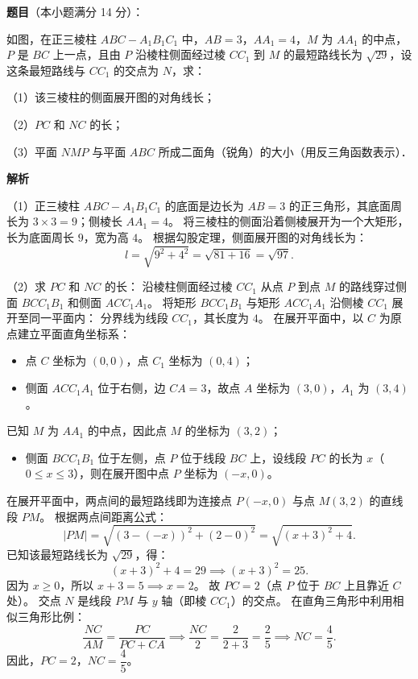 \begin{answer}

\textbf{题目}（本小题满分 14 分）：

如图，在正三棱柱 $ABC-A_1B_1C_1$ 中，$AB=3$，$AA_1=4$，$M$ 为 $AA_1$ 的中点，$P$ 是 $BC$ 上一点，且由 $P$ 沿棱柱侧面经过棱 $CC_1$ 到 $M$ 的最短路线长为 $\sqrt{29}$，设这条最短路线与 $CC_1$ 的交点为 $N$，求：

（1）该三棱柱的侧面展开图的对角线长；

（2）$PC$ 和 $NC$ 的长；

（3）平面 $NMP$ 与平面 $ABC$ 所成二面角（锐角）的大小（用反三角函数表示）．
\nopagebreak[4]
\begin{center}\end{center}
\nopagebreak[4]
\textbf{解析}

（1）正三棱柱 $ABC-A_1B_1C_1$ 的底面是边长为 $AB=3$ 的正三角形，其底面周长为 $3\times 3=9$；侧棱长 $AA_1=4$。
将三棱柱的侧面沿着侧棱展开为一个大矩形，长为底面周长 $9$，宽为高 $4$。
根据勾股定理，侧面展开图的对角线长为：
\nopagebreak[4]
\[
l=\sqrt{9^2+4^2}=\sqrt{81+16}=\sqrt{97}.
\]

（2）求 $PC$ 和 $NC$ 的长：
沿棱柱侧面经过棱 $CC_1$ 从点 $P$ 到点 $M$ 的路线穿过侧面 $BCC_1B_1$ 和侧面 $ACC_1A_1$。
将矩形 $BCC_1B_1$ 与矩形 $ACC_1A_1$ 沿侧棱 $CC_1$ 展开至同一平面内：
分界线为线段 $CC_1$，其长度为 $4$。
在展开平面中，以 $C$ 为原点建立平面直角坐标系：
\begin{itemize}
\item 点 $C$ 坐标为 $(0, 0)$，点 $C_1$ 坐标为 $(0, 4)$；
\item 侧面 $ACC_1A_1$ 位于右侧，边 $CA=3$，故点 $A$ 坐标为 $(3, 0)$，$A_1$ 为 $(3, 4)$。
\end{itemize}
  已知 $M$ 为 $AA_1$ 的中点，因此点 $M$ 的坐标为 $(3, 2)$；
\begin{itemize}
\item 侧面 $BCC_1B_1$ 位于左侧，点 $P$ 位于线段 $BC$ 上，设线段 $PC$ 的长为 $x$（$0\le x\le 3$），则在展开图中点 $P$ 坐标为 $(-x, 0)$。
\end{itemize}
在展开平面中，两点间的最短路线即为连接点 $P(-x, 0)$ 与点 $M(3, 2)$ 的直线段 $PM$。
根据两点间距离公式：
\nopagebreak[4]
\[
|PM|=\sqrt{(3-(-x))^2+(2-0)^2}=\sqrt{(x+3)^2+4}.
\]
已知该最短路线长为 $\sqrt{29}$，得：
\nopagebreak[4]
\[
(x+3)^2+4=29\implies (x+3)^2=25.
\]
因为 $x\ge 0$，所以 $x+3=5\implies x=2$。
故 $PC=2$（点 $P$ 位于 $BC$ 上且靠近 $C$ 处）。
交点 $N$ 是线段 $PM$ 与 $y$ 轴（即棱 $CC_1$）的交点。
在直角三角形中利用相似三角形比例：
\nopagebreak[4]
\[
\frac{NC}{AM}=\frac{PC}{PC+CA}\implies \frac{NC}{2}=\frac{2}{2+3}=\frac{2}{5}\implies NC=\frac{4}{5}.
\]
因此，$PC=2$，$NC=\dfrac{4}{5}$。


\end{answer}
